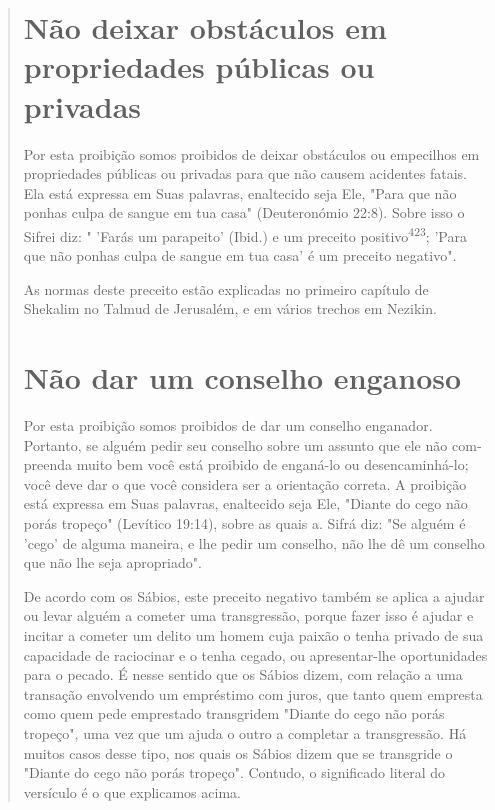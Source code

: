 \begin{quote}

\section{Não deixar obstáculos em propriedades públicas ou privadas}

Por esta proibição somos proibidos de deixar obstáculos ou empe­cilhos
em propriedades públicas ou privadas para que não causem acidentes
fatais. Ela está expressa em Suas palavras, enaltecido seja Ele, "Para
que não ponhas culpa de sangue em tua casa" (Deuteronómio 22:8). Sobre
isso o Sifrei diz: " 'Farás um parapeito' (Ibid.) e um preceito
positivo\textsuperscript{423}; 'Para que não po­nhas culpa de sangue em
tua casa' é um preceito negativo".

As normas deste preceito estão explicadas no primeiro capítulo de
Shekalim no Talmud de Jerusalém, e em vários trechos em Nezikin.

\section{Não dar um conselho enganoso}

Por esta proibição somos proibidos de dar um conselho enganador.
Portanto, se alguém pedir seu conselho sobre um assunto que ele não
com­preenda muito bem você está proibido de enganá-lo ou
desencaminhá-lo; você deve dar o que você considera ser a orientação
correta. A proibição está ex­pressa em Suas palavras, enaltecido seja
Ele, "Diante do cego não porás trope­ço" (Levítico 19:14), sobre as
quais a. Sifrá diz: "Se alguém é 'cego' de alguma maneira, e lhe pedir
um conselho, não lhe dê um conselho que não lhe seja apropriado".

De acordo com os Sábios, este preceito negativo também se aplica a
ajudar ou levar alguém a cometer uma transgressão, porque fazer isso é
ajudar e incitar a cometer um delito um homem cuja paixão o tenha
privado de sua capacidade de raciocinar e o tenha cegado, ou
apresentar-lhe oportunidades para o pecado. É nesse sentido que os
Sábios dizem, com relação a uma transa­ção envolvendo um empréstimo com
juros, que tanto quem empresta como quem pede emprestado transgridem
"Diante do cego não porás tropeço", uma vez que um ajuda o outro a
completar a transgressão. Há muitos casos desse tipo, nos quais os
Sábios dizem que se transgride o "Diante do cego não porás tropeço".
Contudo, o significado literal do versículo é o que explicamos acima.


\end{quote}
